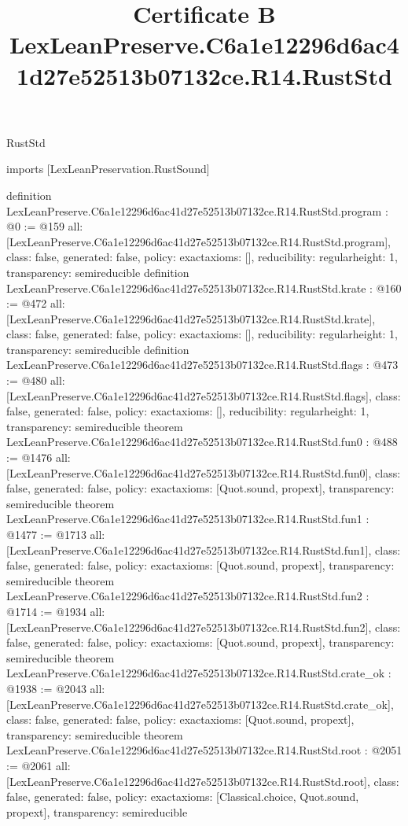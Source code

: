 \begin{lexlean}{RustStd}
\title{Certificate B LexLeanPreserve.C6a1e12296d6ac41d27e52513b07132ce.R14.RustStd}
\begin{coremodule}
imports [LexLeanPreservation.RustSound]

definition LexLeanPreserve.C6a1e12296d6ac41d27e52513b07132ce.R14.RustStd.program : @0 := @159 {
  all: [LexLeanPreserve.C6a1e12296d6ac41d27e52513b07132ce.R14.RustStd.program],
  class: false,
  generated: false,
  policy: exact{axioms: []},
  reducibility: regular{height: 1},
  transparency: semireducible
}
definition LexLeanPreserve.C6a1e12296d6ac41d27e52513b07132ce.R14.RustStd.krate : @160 := @472 {
  all: [LexLeanPreserve.C6a1e12296d6ac41d27e52513b07132ce.R14.RustStd.krate],
  class: false,
  generated: false,
  policy: exact{axioms: []},
  reducibility: regular{height: 1},
  transparency: semireducible
}
definition LexLeanPreserve.C6a1e12296d6ac41d27e52513b07132ce.R14.RustStd.flags : @473 := @480 {
  all: [LexLeanPreserve.C6a1e12296d6ac41d27e52513b07132ce.R14.RustStd.flags],
  class: false,
  generated: false,
  policy: exact{axioms: []},
  reducibility: regular{height: 1},
  transparency: semireducible
}
theorem LexLeanPreserve.C6a1e12296d6ac41d27e52513b07132ce.R14.RustStd.fun0 : @488 := @1476 {
  all: [LexLeanPreserve.C6a1e12296d6ac41d27e52513b07132ce.R14.RustStd.fun0],
  class: false,
  generated: false,
  policy: exact{axioms: [Quot.sound, propext]},
  transparency: semireducible
}
theorem LexLeanPreserve.C6a1e12296d6ac41d27e52513b07132ce.R14.RustStd.fun1 : @1477 := @1713 {
  all: [LexLeanPreserve.C6a1e12296d6ac41d27e52513b07132ce.R14.RustStd.fun1],
  class: false,
  generated: false,
  policy: exact{axioms: [Quot.sound, propext]},
  transparency: semireducible
}
theorem LexLeanPreserve.C6a1e12296d6ac41d27e52513b07132ce.R14.RustStd.fun2 : @1714 := @1934 {
  all: [LexLeanPreserve.C6a1e12296d6ac41d27e52513b07132ce.R14.RustStd.fun2],
  class: false,
  generated: false,
  policy: exact{axioms: [Quot.sound, propext]},
  transparency: semireducible
}
theorem LexLeanPreserve.C6a1e12296d6ac41d27e52513b07132ce.R14.RustStd.crate_ok : @1938 := @2043 {
  all: [LexLeanPreserve.C6a1e12296d6ac41d27e52513b07132ce.R14.RustStd.crate_ok],
  class: false,
  generated: false,
  policy: exact{axioms: [Quot.sound, propext]},
  transparency: semireducible
}
theorem LexLeanPreserve.C6a1e12296d6ac41d27e52513b07132ce.R14.RustStd.root : @2051 := @2061 {
  all: [LexLeanPreserve.C6a1e12296d6ac41d27e52513b07132ce.R14.RustStd.root],
  class: false,
  generated: false,
  policy: exact{axioms: [Classical.choice, Quot.sound, propext]},
  transparency: semireducible
}


\end{coremodule}
\end{lexlean}
